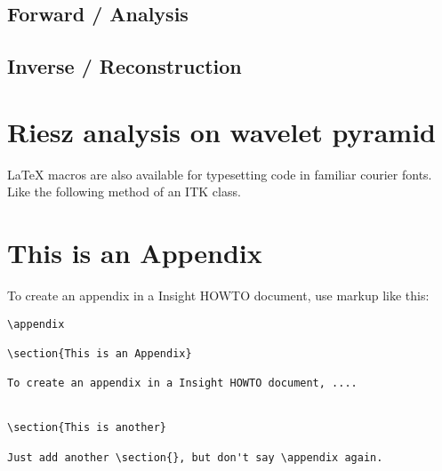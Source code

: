 \documentclass{InsightArticle}
\begin{document}
\subsection{Forward / Analysis}
\label{sub:Forward}

\subsection{Inverse / Reconstruction}
\label{sub:Inverse}

\section{Riesz analysis on wavelet pyramid}

LaTeX macros are also available for typesetting code in familiar courier fonts.
Like the following method of an ITK class.







\appendix

\section{This is an Appendix}

To create an appendix in a Insight HOWTO document, use markup like
this:

\begin{verbatim}
\appendix

\section{This is an Appendix}

To create an appendix in a Insight HOWTO document, ....


\section{This is another}

Just add another \section{}, but don't say \appendix again.
\end{verbatim}
\end{document}
